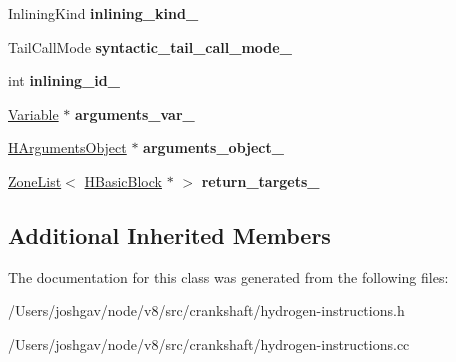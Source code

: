 \begin{DoxyCompactItemize}
\item 
Inlining\+Kind {\bfseries inlining\+\_\+kind\+\_\+}\hypertarget{classv8_1_1internal_1_1_h_enter_inlined_ad33acac72feda8f004a7888b6ad44c8d}{}\label{classv8_1_1internal_1_1_h_enter_inlined_ad33acac72feda8f004a7888b6ad44c8d}

\item 
Tail\+Call\+Mode {\bfseries syntactic\+\_\+tail\+\_\+call\+\_\+mode\+\_\+}\hypertarget{classv8_1_1internal_1_1_h_enter_inlined_ab21d0c35e7e8856364470b1ce6f479c3}{}\label{classv8_1_1internal_1_1_h_enter_inlined_ab21d0c35e7e8856364470b1ce6f479c3}

\item 
int {\bfseries inlining\+\_\+id\+\_\+}\hypertarget{classv8_1_1internal_1_1_h_enter_inlined_ab7fd9cfc988bcb1190647c87bc49e732}{}\label{classv8_1_1internal_1_1_h_enter_inlined_ab7fd9cfc988bcb1190647c87bc49e732}

\item 
\hyperlink{classv8_1_1internal_1_1_variable}{Variable} $\ast$ {\bfseries arguments\+\_\+var\+\_\+}\hypertarget{classv8_1_1internal_1_1_h_enter_inlined_a92e3102fc82df0ef5ffcc803dce740bb}{}\label{classv8_1_1internal_1_1_h_enter_inlined_a92e3102fc82df0ef5ffcc803dce740bb}

\item 
\hyperlink{classv8_1_1internal_1_1_h_arguments_object}{H\+Arguments\+Object} $\ast$ {\bfseries arguments\+\_\+object\+\_\+}\hypertarget{classv8_1_1internal_1_1_h_enter_inlined_a225496358f4abdbe1b7d8167ade8913a}{}\label{classv8_1_1internal_1_1_h_enter_inlined_a225496358f4abdbe1b7d8167ade8913a}

\item 
\hyperlink{classv8_1_1internal_1_1_zone_list}{Zone\+List}$<$ \hyperlink{classv8_1_1internal_1_1_h_basic_block}{H\+Basic\+Block} $\ast$ $>$ {\bfseries return\+\_\+targets\+\_\+}\hypertarget{classv8_1_1internal_1_1_h_enter_inlined_a743fe2d6e50620466c67d83d71112453}{}\label{classv8_1_1internal_1_1_h_enter_inlined_a743fe2d6e50620466c67d83d71112453}

\end{DoxyCompactItemize}
\subsection*{Additional Inherited Members}


The documentation for this class was generated from the following files\+:\begin{DoxyCompactItemize}
\item 
/\+Users/joshgav/node/v8/src/crankshaft/hydrogen-\/instructions.\+h\item 
/\+Users/joshgav/node/v8/src/crankshaft/hydrogen-\/instructions.\+cc\end{DoxyCompactItemize}
